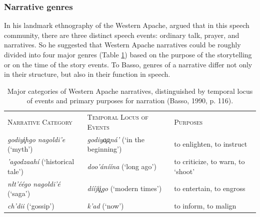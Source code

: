\documentclass[12pt, draft]{article}
\begin{document}
\subsubsection{Narrative genres}
In his landmark ethnography of the Western Apache, \textcite{basso1990} argued that in this speech community, there are three distinct speech events: ordinary talk, prayer, and narratives. So he suggested that Western Apache narratives could be roughly divided into four major genres (Table \ref{basso}) based on the purpose of the storytelling or on the time of the story events. To Basso, genres of a narrative differ not only in their structure, but also in their function in speech.
\begin{table}[h]
\centering
\caption{Major categories of Western Apache narratives, distinguished by temporal locus of events and primary purposes for narration (Basso, 1990, p. 116).}
\label{basso}
\begin{tabular}{|p{2in} p{2.4in} p{1.6in}|} 
\hline
\textsc{Narrative Category} & \textsc{Temporal Locus of Events} & \textsc{Purposes}\\
\textit{godiy{\c i}hgo nagoldi'e} (`myth') & \textit{godiy{\c a\c a}n\'a'} (`in the beginning') & to enlighten, to instruct\\
\hline
\textit{'agodzaah\'i} (`historical tale') & \textit{doo'\'an\'i\'ina} (`long ago') & to criticize, to warn, to `shoot'\\ \hline
\textit{n\l t'\'e\'ego nagoldi'\'e} (`saga') & \textit{d\'i\'ij\c i\c igo} (`modern times') & to entertain, to engross\\ \hline
\textit{ch'dii} (`gossip') & \textit{k'ad} (`now') & to inform, to malign\\
\hline
\end{tabular}
\end{table}
\end{document}
